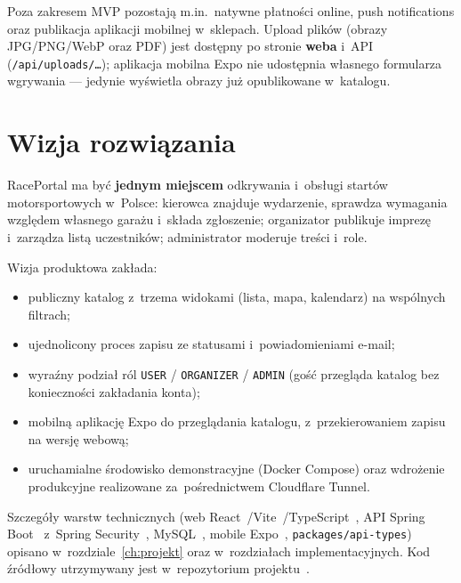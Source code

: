 \documentclass{sprz}
\begin{document}
Poza zakresem MVP pozostają m.in.\ natywne płatności online, push notifications oraz publikacja aplikacji mobilnej w~sklepach. Upload plików (obrazy JPG/PNG/WebP oraz PDF) jest dostępny po stronie \textbf{weba} i~API (\texttt{/api/\allowbreak uploads/\ldots}); aplikacja mobilna Expo nie udostępnia własnego formularza wgrywania --- jedynie wyświetla obrazy już opublikowane w~katalogu.


\section{Wizja rozwiązania}
\label{sec:wizja}
RacePortal ma być \textbf{jednym miejscem} odkrywania i~obsługi startów motorsportowych w~Polsce: kierowca znajduje wydarzenie, sprawdza wymagania względem własnego garażu i~składa zgłoszenie; organizator publikuje imprezę i~zarządza listą uczestników; administrator moderuje treści i~role.

Wizja produktowa zakłada:
\begin{itemize}
  \item publiczny katalog z~trzema widokami (lista, mapa, kalendarz) na wspólnych filtrach;
  \item ujednolicony proces zapisu ze statusami i~powiadomieniami e-mail;
  \item wyraźny podział ról \texttt{USER} / \texttt{ORGANIZER} / \texttt{ADMIN} (gość przegląda katalog bez konieczności zakładania konta);
  \item mobilną aplikację Expo do przeglądania katalogu, z~przekierowaniem zapisu na wersję webową;
  \item uruchamialne środowisko demonstracyjne (Docker Compose) oraz wdrożenie produkcyjne realizowane za~pośrednictwem Cloudflare Tunnel.
\end{itemize}

Szczegóły warstw technicznych (web React~\cite{react:docs}/Vite~\cite{vite:docs}/TypeScript~\cite{typescript:docs}, API Spring Boot~\cite{spring:boot} z~Spring Security~\cite{spring:security}, MySQL~\cite{mysql:docs}, mobile Expo~\cite{expo:docs}, \texttt{packages/api-types}) opisano w~rozdziale~\ref{ch:projekt} oraz w~rozdziałach implementacyjnych. Kod źródłowy utrzymywany jest w~repozytorium projektu~\cite{raceportal:repo}.
\end{document}
